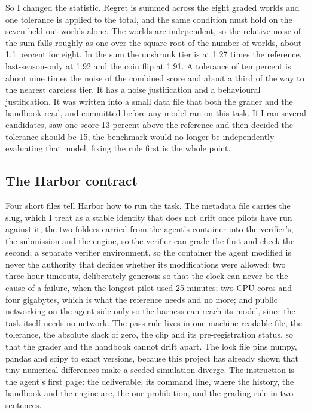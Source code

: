 \documentclass[11pt,letterpaper]{article}
\begin{document}
So I changed the statistic. Regret is summed across the eight graded worlds and one tolerance is applied to the total, and the same condition must hold on the seven held-out worlds alone. The worlds are independent, so the relative noise of the sum falls roughly as one over the square root of the number of worlds, about 1.1 percent for eight. In the sum the unshrunk tier is at 1.27 times the reference, last-season-only at 1.92 and the coin flip at 1.91. A tolerance of ten percent is about nine times the noise of the combined score and about a third of the way to the nearest careless tier. It has a noise justification and a behavioural justification. It was written into a small data file that both the grader and the handbook read, and committed before any model ran on this task. If I ran several candidates, saw one score 13 percent above the reference and then decided the tolerance should be 15, the benchmark would no longer be independently evaluating that model; fixing the rule first is the whole point.


\subsection{The Harbor contract}

Four short files tell Harbor how to run the task. The metadata file carries the slug, which I treat as a stable identity that does not drift once pilots have run against it; the two folders carried from the agent's container into the verifier's, the submission and the engine, so the verifier can grade the first and check the second; a separate verifier environment, so the container the agent modified is never the authority that decides whether its modifications were allowed; two three-hour timeouts, deliberately generous so that the clock can never be the cause of a failure, when the longest pilot used 25 minutes; two CPU cores and four gigabytes, which is what the reference needs and no more; and public networking on the agent side only so the harness can reach its model, since the task itself needs no network. The pass rule lives in one machine-readable file, the tolerance, the absolute slack of zero, the clip and its pre-registration status, so that the grader and the handbook cannot drift apart. The lock file pins numpy, pandas and scipy to exact versions, because this project has already shown that tiny numerical differences make a seeded simulation diverge. The instruction is the agent's first page: the deliverable, its command line, where the history, the handbook and the engine are, the one prohibition, and the grading rule in two sentences.
\end{document}
